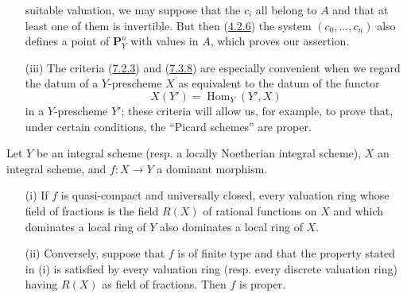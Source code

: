 \begin{remark}[7.3.9]
\begin{enumerate}
suitable valuation, we may suppose that the $c_i$ all belong to
$A$ and that at least one of them is invertible. But then
(\hyperref[II.4.2.6]{4.2.6}) the system $(c_0,\ldots,c_n)$ also defines
a point of $\mathbf{P}_Y^n$ with values in $A$, which proves our
assertion.
\item[\rm (iii)] The criteria (\hyperref[II.7.2.3]{7.2.3}) and
(\hyperref[II.7.3.8]{7.3.8}) are especially convenient when we regard the
datum of a $Y$-prescheme $X$ as equivalent to the datum of the functor
\[
X(Y')=\operatorname{Hom}_Y(Y',X)
\]
in a $Y$-prescheme $Y'$; these criteria will allow us, for example, to
prove that, under certain conditions, the ``Picard schemes'' are proper.
\end{enumerate}
\end{remark}

\begin{corollary}[7.3.10]
\label{II.7.3.10}
Let $Y$ be an integral scheme (resp. a locally Noetherian integral scheme),
$X$ an integral scheme, and $f:X\to Y$ a dominant morphism.
\begin{enumerate}
\item[\rm (i)] If $f$ is quasi-compact and universally closed, every valuation
ring whose field of fractions is the field $R(X)$ of rational functions
on $X$ and which dominates a local ring of $Y$ also dominates a
local ring of $X$.
\item[\rm (ii)] Conversely, suppose that $f$ is of finite type and that the
property stated in (i) is satisfied by every valuation ring (resp.
every discrete valuation ring) having $R(X)$ as field of fractions.
Then $f$ is proper.
\end{enumerate}
\end{corollary}

